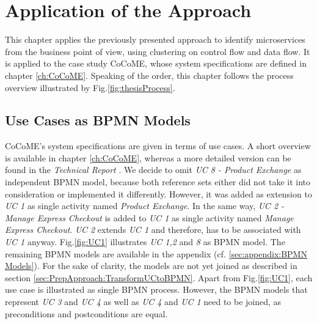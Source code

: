 \chapter{Application of the Approach}
\label{ch:SolutionApplication}
This chapter applies the previously presented approach to identify microservices from the business point of view, using clustering on control flow and data flow. It is applied to the case study CoCoME, whose system specifications are defined in chapter \ref{ch:CoCoME}. Speaking of the order, this chapter follows the process overview illustrated by Fig.\ref{fig:thesisProcess}.

\section{Use Cases as BPMN Models}
CoCoME's system specifications are given in terms of use cases. A short overview is available in chapter \ref{ch:CoCoME}, whereas a more detailed version can be found in the \textit{Technical Report} \cite{CoCoMETechnical}. We decide to omit  \textit{UC 8 - Product Exchange} as independent BPMN model, because both reference sets either did not take it into consideration or implemented it differently. However, it was added as extension to \textit{UC 1} as single activity named \textit{Product Exchange}. In the same way, \textit{UC 2 - Manage Express Checkout} is added to \textit{UC 1} as single activity named \textit{Manage Express Checkout}. \textit{UC 2} extends \textit{UC 1} and therefore, has to be associated with \textit{UC 1} anyway.  Fig.\ref{fig:UC1} illustrates \textit{UC 1,2} and \textit{8} as BPMN model. The remaining BPMN models are available in the appendix (cf. \ref{sec:appendix:BPMN Models}). For the sake of clarity, the models are not yet joined as described in section \ref{sec:PrepApproach:TransformUCtoBPMN}. Apart from Fig.\ref{fig:UC1}, each use case is illustrated as single BPMN process. However, the BPMN models that represent \textit{UC 3} and \textit{UC 4} as well as \textit{UC 4} and \textit{UC 1} need to be joined, as preconditions and postconditions are equal. 



